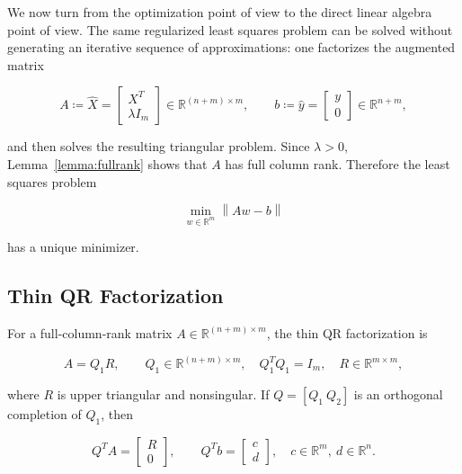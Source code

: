 \documentclass[11pt,a4paper]{article}
\newcommand{\R}{\mathbb{R}}
\newcommand{\norm}[1]{\left\|#1\right\|}
\newcommand{\Xhat}{\hat{X}}
\newcommand{\yhat}{\hat{y}}
\begin{document}
We now turn from the optimization point of view to the direct linear algebra point 
of view. The same regularized least squares problem can be solved without generating 
an iterative sequence of approximations: one factorizes the augmented matrix

\begin{equation}
    A \coloneqq \Xhat =
    \begin{bmatrix}
        X^T \\ \lambda I_m
    \end{bmatrix}
    \in \R^{(n+m)\times m},
    \qquad
    b \coloneqq \yhat =
    \begin{bmatrix}
        y \\ 0
    \end{bmatrix}
    \in \R^{n+m},
\end{equation}

and then solves the resulting triangular problem. Since $\lambda > 0$, 
Lemma~\ref{lemma:fullrank} shows that $A$ has full column rank. Therefore the 
least squares problem

\begin{equation}
    \min_{w\in\R^m} \norm{Aw-b}
\end{equation}

has a unique minimizer.

\subsection{Thin QR Factorization}

For a full-column-rank matrix $A\in\R^{(n+m)\times m}$, the thin QR 
factorization is

\begin{equation}
\label{eq:thin_qr}
    A = Q_1 R,
    \qquad
    Q_1 \in \R^{(n+m)\times m}, \quad Q_1^T Q_1 = I_m,
    \quad
    R \in \R^{m\times m},
\end{equation}

where $R$ is upper triangular and nonsingular. If $Q=[Q_1\ Q_2]$ is an orthogonal 
completion of $Q_1$, then

\begin{equation}
    Q^T A =
    \begin{bmatrix}
        R \\ 0
    \end{bmatrix},
    \qquad
    Q^T b =
    \begin{bmatrix}
        c \\ d
    \end{bmatrix},
    \quad c\in\R^m,\ d\in\R^{n}.
\end{equation}
\end{document}
